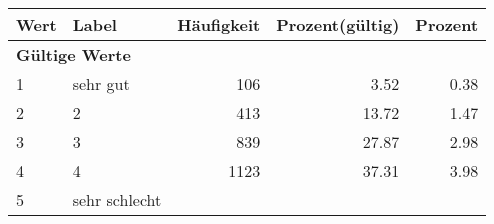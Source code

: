      \begin{longtable}{lXrrr}
     \toprule
     \textbf{Wert} & \textbf{Label} & \textbf{Häufigkeit} & \textbf{Prozent(gültig)} & \textbf{Prozent} \\
     \endhead
     \midrule
     \multicolumn{5}{l}{\textbf{Gültige Werte}}\\

     1 &
     \multicolumn{1}{X}{ sehr gut   } &


       \num{106} &
       \num[round-mode=places,round-precision=2]{3.52} &
         \num[round-mode=places,round-precision=2]{0.38} \\

     2 &
     \multicolumn{1}{X}{ 2   } &


       \num{413} &
       \num[round-mode=places,round-precision=2]{13.72} &
         \num[round-mode=places,round-precision=2]{1.47} \\

     3 &
     \multicolumn{1}{X}{ 3   } &


       \num{839} &
       \num[round-mode=places,round-precision=2]{27.87} &
         \num[round-mode=places,round-precision=2]{2.98} \\

     4 &
     \multicolumn{1}{X}{ 4   } &


       \num{1123} &
       \num[round-mode=places,round-precision=2]{37.31} &
         \num[round-mode=places,round-precision=2]{3.98} \\

     5 &
     \multicolumn{1}{X}{ sehr schlecht   } &



\end{longtable}
